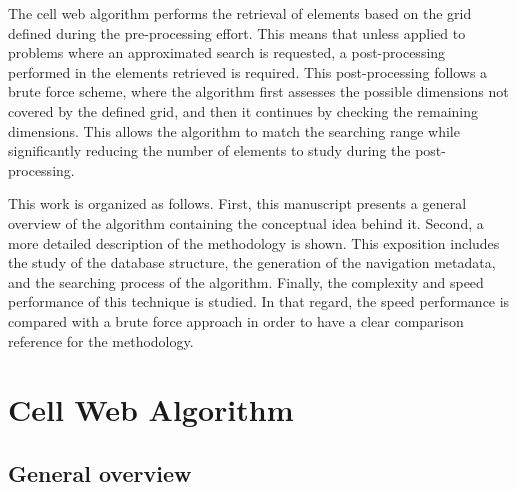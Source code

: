 \documentclass[review]{elsarticle}
\begin{document}
The cell web algorithm performs the retrieval of elements based on the grid defined during the pre-processing effort. This means that unless applied to problems where an approximated search is requested, a post-processing performed in the elements retrieved is required. This post-processing follows a brute force scheme, where the algorithm first assesses the possible dimensions not covered by the defined grid, and then it continues by checking the remaining dimensions. This allows the algorithm to match the searching range while significantly reducing the number of elements to study during the post-processing.

This work is organized as follows. First, this manuscript presents a general overview of the algorithm containing the conceptual idea behind it. Second, a more detailed description of the methodology is shown. This exposition includes the study of the database structure, the generation of the navigation metadata, and the searching process of the algorithm. Finally, the complexity and speed performance of this technique is studied. In that regard, the speed performance is compared with a brute force approach in order to have a clear comparison reference for the methodology.


\section{Cell Web Algorithm}
\label{sec:algorithm}

\subsection{General overview}
\label{sec:idea}
\end{document}
